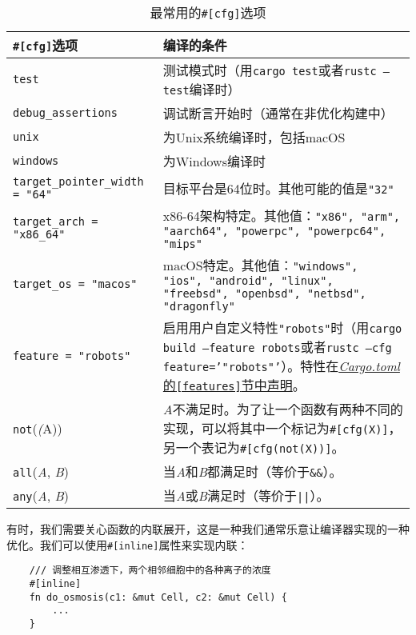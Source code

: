 \begin{table}[htbp]
    \centering
    \caption{最常用的\texttt{\#[cfg]}选项}
    \label{t8-2}
    \begin{tabular}{p{}p{}}
        \hline
        \textbf{\texttt{\#[cfg]}选项}   & \textbf{编译的条件} \\
        \hline
        \texttt{test}   & 测试模式时（用\texttt{cargo test}或者\texttt{rustc --test}编译时） \\
        \rowcolor{tablecolor}
        \texttt{debug\_assertions} & 调试断言开始时（通常在非优化构建中） \\
        \texttt{unix}   & 为Unix系统编译时，包括macOS \\
        \rowcolor{tablecolor}
        \texttt{windows}& 为Windows编译时 \\
        \texttt{target\_pointer\_width = "64"} & 目标平台是64位时。其他可能的值是\texttt{"32"} \\
        \rowcolor{tablecolor}
        \texttt{target\_arch = "x86\_64"} & x86-64架构特定。其他值：\texttt{"x86", "arm", "aarch64", "powerpc", "powerpc64", "mips"} \\
        \texttt{target\_os = "macos"} & macOS特定。其他值：\texttt{"windows", "ios", "android", "linux", "freebsd", "openbsd", "netbsd", "dragonfly"} \\
        \rowcolor{tablecolor}
        \texttt{feature = "robots"} & 启用用户自定义特性\texttt{"robots"}时（用\texttt{cargo build --feature robots}或者\texttt{rustc --cfg feature='"robots"'}）。特性在\href{https://doc.rust-lang.org/cargo/reference/manifest.html}{\emph{Cargo.toml}的\texttt{[features]}节中声明}。 \\
        \texttt{not}(\emph(A)) & \emph{A}不满足时。为了让一个函数有两种不同的实现，可以将其中一个标记为\texttt{\#[cfg(X)]}，另一个表记为\texttt{\#[cfg(not(X))]}。 \\
        \rowcolor{tablecolor}
        \texttt{all}(\emph{A}, \emph{B}) & 当\emph{A}和\emph{B}都满足时（等价于\texttt{\&\&}）。 \\
        \texttt{any}(\emph{A}, \emph{B}) & 当\emph{A}或\emph{B}满足时（等价于\texttt{||}）。 \\
    \end{tabular}
\end{table}

有时，我们需要关心函数的内联展开，这是一种我们通常乐意让编译器实现的一种优化。我们可以使用\texttt{\#[inline]}属性来实现内联：
\begin{verbatim}
    /// 调整相互渗透下，两个相邻细胞中的各种离子的浓度
    #[inline]
    fn do_osmosis(c1: &mut Cell, c2: &mut Cell) {
        ...
    }
\end{verbatim}

